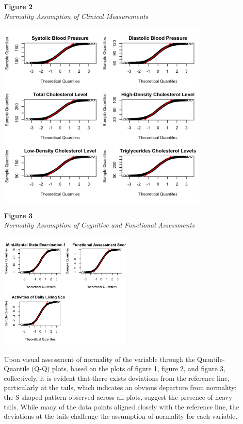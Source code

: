 \documentclass[12pt]{article}
\begin{document}
\noindent
\textbf{Figure 2}\\
\textit{Normality Assumption of Clinical Measurements}
\begin{center}
    \includegraphics[width = 0.8\textwidth]{QQ_Clinical Measures.png}
\end{center}

\noindent
\textbf{Figure 3}\\
\textit{Normality Assumption of Cognitive and Functional Assessments}
\begin{center}
    \includegraphics[width = 0.5\textwidth]{QQ_Cog and Funcs.png}
\end{center}

Upon visual assessment of normality of the variable through the Quantile-Quantile (Q-Q) plots, based on the plots of figure 1, figure 2, and figure 3, collectively, it is evident 
that there exists deviations from the reference line, particularly at the tails, which indicates an obvious departure from normality; the S-shaped pattern observed across all plots, 
suggest the presence of heavy tails. While many of the data points aligned closely with the reference line, the deviations at the tails challenge the assumption of normality for each variable. 
\end{document}
